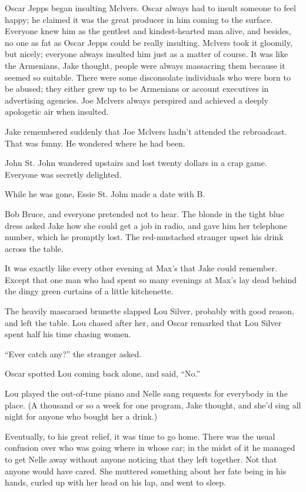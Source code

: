 \documentclass{novel}
\begin{document}
Oscar Jepps began insulting Mclvers. Oscar always had to insult someone to feel happy; he claimed it was the great producer in him coming to the surface. Everyone knew him as the gentlest and kindest-hearted man alive, and besides, no one as fat as Oscar Jepps could be really insulting. Mclvers took it gloomily, but nicely; everyone always insulted him just as a matter of course. It was like the Armenians, Jake thought, people were always massacring them because it seemed so suitable. There were some disconsolate individuals who were born to be abused; they either grew up to be Armenians or account executives in advertising agencies. Joe Mclvers always perspired and achieved a deeply apologetic air when insulted.

Jake remembered suddenly that Joe Mclvers hadn’t attended the rebroadcast. That was funny. He wondered where he had been.

John St. John wandered upstairs and lost twenty dollars in a crap game. Everyone was secretly delighted.

While he was gone, Essie St. John made a date with B.

Bob Bruce, and everyone pretended not to hear. The blonde in the tight blue dress asked Jake how she could get a job in radio, and gave him her telephone number, which he promptly lost. The red-mustached stranger upset his drink across the table.

It was exactly like every other evening at Max’s that Jake could remember. Except that one man who had spent so many evenings at Max’s lay dead behind the dingy green curtains of a little kitchenette.

The heavily mascaraed brunette slapped Lou Silver, probably with good reason, and left the table. Lou chased after her, and Oscar remarked that Lou Silver spent half his time chasing women.

“Ever catch any?” the stranger asked.

Oscar spotted Lou coming back alone, and said, “No.”

Lou played the out-of-tune piano and Nelle sang requests for everybody in the place. (A thousand or so a week for one program, Jake thought, and she’d sing all night for anyone who bought her a drink.)

Eventually, to his great relief, it was time to go home. There was the usual confusion over who was going where in whose car; in the midst of it he managed to get Nelle away without anyone noticing that they left together. Not that anyone would have cared. She muttered something about her fate being in his hands, curled up with her head on his lap, and went to sleep.
\end{document}
